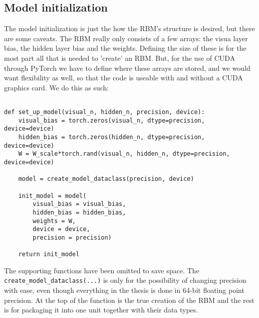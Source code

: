 \subsection{Model initialization}

The model initialization is just the how the RBM's structure is desired, but there are some caveats. The RBM really only consists of a few arrays: the visua layer bias, the hidden layer bias and the weights. Defining the size of these is for the most part all that is needed to 'create' an RBM. But, for the use of CUDA through PyTorch we have to define where these arrays are stored, and we would want flexibility as well, so that the code is useable with and without a CUDA graphics card. We do this as such:

\begin{verbatim}

def set_up_model(visual_n, hidden_n, precision, device):
    visual_bias = torch.zeros(visual_n, dtype=precision, device=device)
    hidden_bias = torch.zeros(hidden_n, dtype=precision, device=device)
    W = W_scale*torch.rand(visual_n, hidden_n, dtype=precision, device=device)
    
    model = create_model_dataclass(precision, device)

    init_model = model(
        visual_bias = visual_bias,
        hidden_bias = hidden_bias,
        weights = W,
        device = device, 
        precision = precision)
    
    return init_model
\end{verbatim}

The supporting functions have been omitted to save space. The \texttt{create_model_dataclass(...)} is only for the possibility of changing precision with ease, even though everything in the thesis is done in 64-bit floating point precision. At the top of the function is the true creation of the RBM and the rest is for packaging it into one unit together with their data types. 
